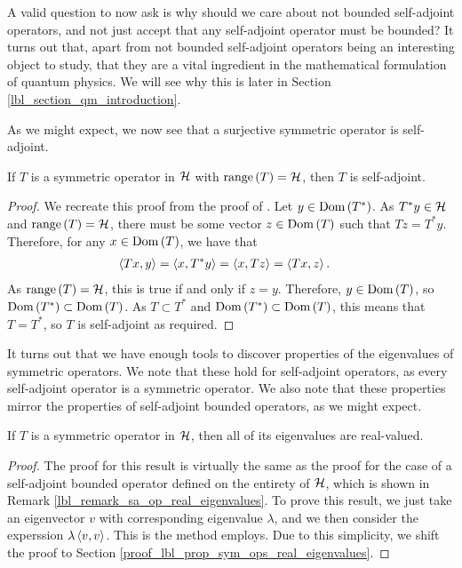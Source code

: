 \medskip

A valid question to now ask is why should we care about not bounded self-adjoint operators, and not just accept that any self-adjoint operator must be bounded? It turns out that, apart from not bounded self-adjoint operators being an interesting object to study, that they are a vital ingredient in the mathematical formulation of quantum physics. We will see why this is later in Section \eqref{lbl_section_qm_introduction}.

\medskip


As we might expect, we now see that a surjective symmetric operator is self-adjoint.

\begin{proposition}\label{lbl_prop_sym_op_with_range_H}
  If $T$ is a symmetric operator in $\mathcal{H}$ with $\operatorname{range}\left(T\right) = \mathcal{H}$, then $T$ is self-adjoint.
\end{proposition}
\begin{proof}
  We recreate this proof from the proof of {\cite[Chapter 41 Theorem 1]{glazman}}. Let $y \in \operatorname{Dom}\left(T^*\right)$. As $T^*y \in \mathcal{H}$ and $\operatorname{range}\left(T\right) = \mathcal{H}$, there must be some vector $z \in \operatorname{Dom}\left(T\right)$ such that $Tz = T^*y$. Therefore, for any $x \in \operatorname{Dom}\left(T\right)$, we have that
  \begin{align*}
    \left\langle Tx, y\right\rangle
    &=
    \left\langle x, T^* y\right\rangle
    =
    \left\langle x, Tz\right\rangle
    =
    \left\langle Tx, z\right\rangle.
  \end{align*}
  As $\operatorname{range}\left(T\right) = \mathcal{H}$, this is true if and only if $z = y$. Therefore, $y \in \operatorname{Dom}\left(T\right)$, so $\operatorname{Dom}\left(T^*\right) \subset \operatorname{Dom}\left(T\right)$. As $T \subset T^*$ and $\operatorname{Dom}\left(T^*\right) \subset \operatorname{Dom}\left(T\right)$, this means that $T = T^*$, so $T$ is self-adjoint as required.
\end{proof}

It turns out that we have enough tools to discover properties of the eigenvalues of symmetric operators. We note that these hold for self-adjoint operators, as every self-adjoint operator is a symmetric operator. We also note that these properties mirror the properties of self-adjoint bounded operators, as we might expect.

\begin{proposition}\label{lbl_prop_sym_ops_real_eigenvalues}
  If $T$ is a symmetric operator in $\mathcal{H}$, then all of its eigenvalues are real-valued.
\end{proposition}
\begin{proof}
  The proof for this result is virtually the same as the proof for the case of a self-adjoint bounded operator defined on the entirety of $\mathcal{H}$, which is shown in Remark \eqref{lbl_remark_sa_op_real_eigenvalues}. To prove this result, we just take an eigenvector $v$ with corresponding eigenvalue $\lambda$, and we then consider the experssion $\lambda\left\langle v,v\right\rangle$. This is the method {\cite[Chapter 41, Theorem 2]{glazman}} employs. Due to this simplicity, we shift the proof to Section \eqref{proof_lbl_prop_sym_ops_real_eigenvalues}.
\end{proof}

